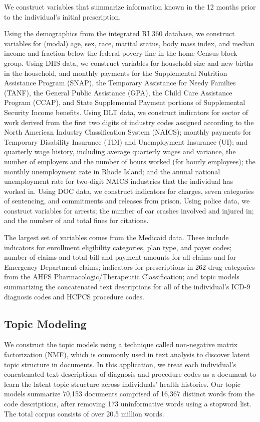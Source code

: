 \documentclass[10pt, letter]{article}
\begin{document}
We construct variables that summarize information known in the 12 months prior to the individual's initial prescription.

Using the demographics from the integrated RI 360 database, we construct variables for (modal) age, sex, race, marital status, body mass index, and median income and fraction below the federal povery line in the home Census block group. Using DHS data, we construct variables for household size and new births in the household, and monthly payments for the Supplemental Nutrition Assistance Program (SNAP), the Temporary Assistance for Needy Families (TANF), the General Public Assistance (GPA), the Child Care Assistance Program (CCAP), and State Supplemental Payment portions of Supplemental Security Income benefits. Using DLT data, we construct indicators for sector of work derived from the first two digits of industry codes assigned according to the North American Industry Classification System (NAICS); monthly payments for Temporary Disability Insurance (TDI) and Unemployment Insurance (UI); and quarterly wage history, including average quarterly wages and variance, the number of employers and the number of hours worked (for hourly employees); the monthly unemployment rate in Rhode Island; and the annual national unemployment rate for two-digit NAICS industries that the individual has worked in. Using DOC data, we construct indicators for charges, seven categories of sentencing, and commitments and releases from prison. Using police data, we construct variables for arrests; the number of car crashes involved and injured in; and the number of and total fines for citations.

The largest set of variables comes from the Medicaid data. These include indicators for enrollment eligibility categories, plan type, and payer codes; number of claims and total bill and payment amounts for all claims and for Emergency Department claims; indicators for prescriptions in 262 drug categories from the AHFS Pharmacologic/Therapeutic Classification; and topic models summarizing the concatenated text descriptions for all of the individual's ICD-9 diagnosis codes and HCPCS procedure codes.

\subsection{Topic Modeling}

We construct the topic models using a technique called non-negative matrix factorization (NMF), which is commonly used in text analysis to discover latent topic structure in documents. In this application, we treat each individual's concatenated text descriptions of diagnosis and procedure codes as a document to learn the latent topic structure across individuals' health histories. Our topic models summarize 70,153 documents comprised of 16,367 distinct words from the code descriptions, after removing 173 uninformative words using a stopword list. The total corpus consists of over 20.5 million words.
\end{document}
